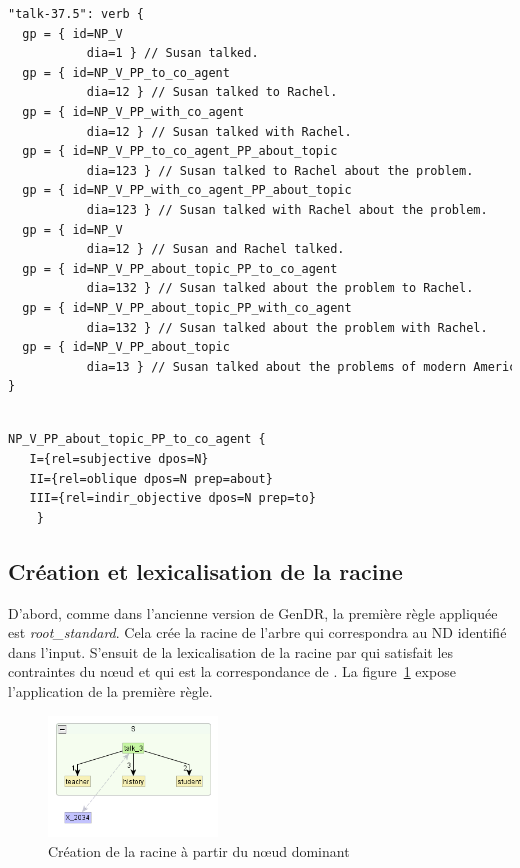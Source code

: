 \begin{lstlisting}[language=XML, caption=Classe \texttt{talk-37.5}]
"talk-37.5": verb {
  gp = { id=NP_V
	       dia=1 } // Susan talked.
  gp = { id=NP_V_PP_to_co_agent
	       dia=12 } // Susan talked to Rachel.
  gp = { id=NP_V_PP_with_co_agent
	       dia=12 } // Susan talked with Rachel.
  gp = { id=NP_V_PP_to_co_agent_PP_about_topic
	       dia=123 } // Susan talked to Rachel about the problem.
  gp = { id=NP_V_PP_with_co_agent_PP_about_topic
	       dia=123 } // Susan talked with Rachel about the problem.
  gp = { id=NP_V
	       dia=12 } // Susan and Rachel talked.
  gp = { id=NP_V_PP_about_topic_PP_to_co_agent
	       dia=132 } // Susan talked about the problem to Rachel.
  gp = { id=NP_V_PP_about_topic_PP_with_co_agent
	       dia=132 } // Susan talked about the problem with Rachel.
  gp = { id=NP_V_PP_about_topic
	       dia=13 } // Susan talked about the problems of modern America.
}
\end{lstlisting}

\begin{lstlisting}[language=XML, caption=Propriétés syntaxiques de \texttt{NP\_V\_PP\_about\_topic\_PP\_to\_co\_agent} , label=gpexemple]

NP_V_PP_about_topic_PP_to_co_agent {
   I={rel=subjective dpos=N}
   II={rel=oblique dpos=N prep=about}
   III={rel=indir_objective dpos=N prep=to}
	}
\end{lstlisting}

\subsection{Création et lexicalisation de la racine}
D'abord, comme dans l'ancienne version de GenDR, la première règle appliquée est \emph{root\_standard}. Cela crée la racine de l'arbre qui correspondra au \ac{ND} identifié dans l'input. S'ensuit de la lexicalisation de la racine par  qui satisfait les contraintes du n\oe{}ud et qui est la correspondance de . La figure~\ref{deroulement0} expose l'application de la première règle.
\begin{figure}[htb]
	\centering
	\includegraphics[width=0.4\textwidth, trim = {0cm 0cm 0cm 0cm},clip]{ch6/figs/root.png}
	\caption{Création de la racine à partir du n\oe{}ud dominant}
	\label{deroulement0}
\end{figure}


